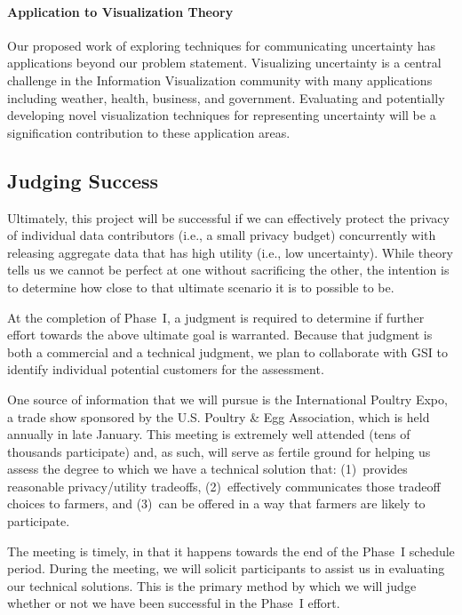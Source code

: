 \paragraph{Application to Visualization Theory} 
Our proposed work of exploring techniques for communicating uncertainty has applications beyond our problem statement. Visualizing uncertainty is a central challenge in the Information Visualization community with many applications including weather, health, business, and government. Evaluating and potentially developing novel visualization techniques for representing uncertainty will be a signification contribution to these application areas.  

\subsection{Judging Success}
\label{sec:exp}

Ultimately, this project will be successful if we can effectively
protect the privacy of individual data contributors (i.e., a small
privacy budget) concurrently with releasing aggregate data that has
high utility (i.e., low uncertainty).  While theory tells us we cannot
be perfect at one without sacrificing the other, the intention
is to determine how close to that ultimate scenario it is to possible to be.

At the completion of Phase~I, a judgment is required to determine if
further effort towards the above ultimate goal is warranted.
Because that judgment is both a commercial and a technical judgment, we
plan to collaborate with GSI to identify individual potential
customers for the assessment.

One source of information that we will pursue is the International
Poultry Expo, a trade show sponsored by the U.S. Poultry \& Egg Association,
which is held annually in late January.
This meeting is extremely well attended (tens of thousands participate)
and, as such, will serve as fertile ground for helping us assess the
degree to which we have a technical solution that: (1)~provides reasonable
privacy/utility tradeoffs, (2)~effectively communicates those tradeoff
choices to farmers, and (3)~can be offered in a way that farmers are
likely to participate.

The meeting is timely, in that it happens towards the end of the
Phase~I schedule period. During the meeting, we will solicit
participants to assist us in evaluating our technical solutions.
This is the primary method by which
we will judge whether or not we have been successful
in the Phase~I effort.

